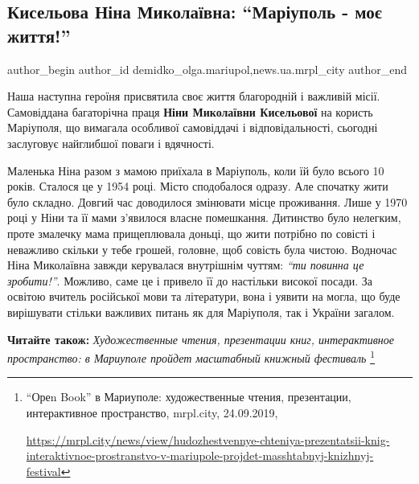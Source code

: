 
 
 
 
 
 
\subsection{Кисельова Ніна Миколаївна: \enquote{Маріуполь - моє життя!}}
\label{sec:24_09_2019.stz.news.ua.mrpl_city.1.kiseljova_nina_mykolaivna_mrpl_moje_zhyttja}
 
\ifcmt
 author_begin
   author_id demidko_olga.mariupol,news.ua.mrpl_city
 author_end
\fi

Наша наступна героїня присвятила своє життя благородній і важливій місії.
Самовіддана багаторічна праця \textbf{Ніни Миколаївни Кисельової} на користь Маріуполя,
що вимагала особливої самовіддачі і відповідальності, сьогодні заслуговує
найглибшої поваги і вдячності.


Маленька Ніна разом з мамою приїхала в Маріуполь, коли їй було всього 10 років.
Сталося це у 1954 році. Місто сподобалося одразу. Але спочатку жити було
складно. Довгий час доводилося змінювати місце проживання. Лише у 1970 році у
Ніни та її мами з'явилося власне помешкання. Дитинство було нелегким, проте
змалечку мама прищеплювала доньці, що жити потрібно по совісті і неважливо
скільки у тебе грошей, головне, щоб совість була чистою. Водночас Ніна
Миколаївна завжди керувалася внутрішнім чуттям: \emph{\enquote{ти повинна це зробити!}}.
Можливо, саме це і привело її до настільки високої посади. За освітою вчитель
російської мови та літератури, вона і уявити на могла, що буде вирішувати
стільки важливих питань як для Маріуполя, так і України загалом.

\textbf{Читайте також:} \emph{Художественные чтения, презентации книг, интерактивное пространство: в Мариуполе пройдет масштабный книжный фестиваль}%
\footnote{\enquote{Ореn Book} в Мариуполе: художественные чтения, презентации, интерактивное пространство, mrpl.city, 24.09.2019, \par%
\url{https://mrpl.city/news/view/hudozhestvennye-chteniya-prezentatsii-knig-interaktivnoe-prostranstvo-v-mariupole-projdet-masshtabnyj-knizhnyj-festival}}

